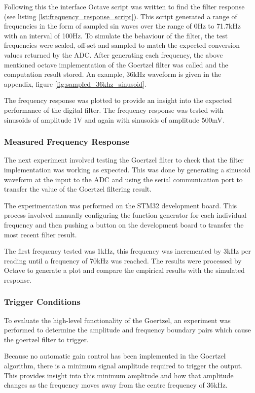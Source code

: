 Following this the interface Octave script was written to find the filter response (see listing \ref{lst:frequency_response_script}). This script generated a range of frequencies in the form of sampled sin waves over the range of 0Hz to 71.7kHz with an interval of 100Hz. To simulate the behaviour of the filter, the test frequencies were scaled, off-set and sampled to match the expected conversion values returned by the ADC. After generating each frequency, the above mentioned octave implementation of the Goertzel filter was called and the computation result stored. An example, 36kHz waveform is given in the appendix, figure \ref{fig:sampled_36khz_sinusoid}.

The frequency response was plotted to provide an insight into the expected performance of the digital filter. The frequency response was tested with sinusoids of amplitude 1V and again with sinusoids of amplitude 500mV.

\subsubsection{Measured Frequency Response}
The next experiment involved testing the Goertzel filter to check that the filter implementation was working as expected. This was done by generating a sinusoid waveform at the input to the ADC and using the serial communication port to transfer the value of the Goertzel filtering result. 

The experimentation was performed on the STM32 development board. This process involved manually configuring the function generator for each individual frequency and then pushing a button on the development board to transfer the most recent filter result.

The first frequency tested was 1kHz, this frequency was incremented by 3kHz per reading until a frequency of 70kHz was reached. The results were processed by Octave to generate a plot and compare the empirical results with the simulated response.


\subsubsection{Trigger Conditions}
To evaluate the high-level functionality of the Goertzel, an experiment was performed to determine the amplitude and frequency boundary pairs which cause the goertzel filter to trigger.

Because no automatic gain control has been implemented in the Goertzel algorithm, there is a minimum signal  amplitude required to trigger the output. This provides insight into this minimum amplitude and how that amplitude changes as the frequency moves away from the centre frequency of 36kHz.

